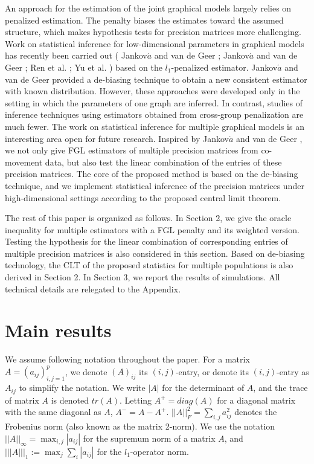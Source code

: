 \documentclass[review]{elsarticle}
\newcommand{\1}{{\bf 1}}
\newcommand{\0}{{\bf 0}}
\begin{document}
 An approach for the estimation of the joint graphical models largely relies on penalized estimation.
 The penalty biases the estimates toward the assumed structure, which makes hypothesis tests for precision matrices more challenging.
 Work on statistical inference for low-dimensional parameters in graphical models has recently been carried out (%
Jankov$\acute{a}$ and van de Geer \cite{jankova2015confidence}; Jankov$\acute{a}$ and van de Geer \cite{jankova2017honest}; Ren et al. \cite{ren2015asymptotic}; Yu et al. \cite{yu2020simultaneous}) based on the $l_1$-penalized estimator.
 Jankov$\acute{a}$ and van de Geer \cite{jankova2015confidence} provided a de-biasing technique to obtain a new consistent estimator with known distribution.
 However, these approaches were developed only in the setting in which the parameters of one graph are inferred.
 In contrast, studies of inference techniques using estimators obtained from cross-group penalization are much fewer.
 The work on statistical inference for multiple graphical models is an interesting area open for future research.
 Inspired by Jankov$\acute{a}$ and van de Geer \cite{jankova2015confidence}, we not only give FGL estimators of multiple precision matrices from co-movement data, but also test the linear combination of the entries of these precision matrices.
 The core of the proposed method is based on the de-biasing technique, and we implement statistical inference of the precision matrices under high-dimensional settings according to the proposed central limit theorem.

 The rest of this paper is organized as follows.
 In Section 2, we give the oracle inequality for multiple estimators with a FGL penalty and its weighted version.
 Testing the hypothesis for the linear combination of corresponding entries of multiple precision matrices is also considered in this section.
 Based on de-biasing technology, the CLT of the proposed statistics for multiple populations is also derived in Section 2.
 In Section 3, we report the results of  simulations.
 All technical details are relegated to the Appendix.

\section{Main results}

 We assume following notation throughout the paper.
 For a matrix $A=(a_{ij})_{i,j=1}^{p}$, we denote $(A)_{ij}$ its $(i,j)$-entry, or denote its $(i,j)$-entry as $A_{ij}$ to simplify the notation.
 We write $|A|$ for the determinant of $A$, and the trace of matrix $A$ is denoted $tr(A)$.
 Letting $A^{+}=diag(A)$ for a diagonal matrix with the same diagonal as $A$, $A^{-}=A-A^{+}$.
 $||A||_F^2=\sum_{i,j}a_{ij}^2$ denotes the Frobenius norm (also known as the matrix 2-norm).
 We use the notation $||A||_{\infty}=\max_{i,j}|a_{ij}|$ for the supremum norm of a matrix $A$, and $|||A|||_1:=\max_{j}\sum_{i}|a_{ij}|$ for the $l_1$-operator norm.
\end{document}
